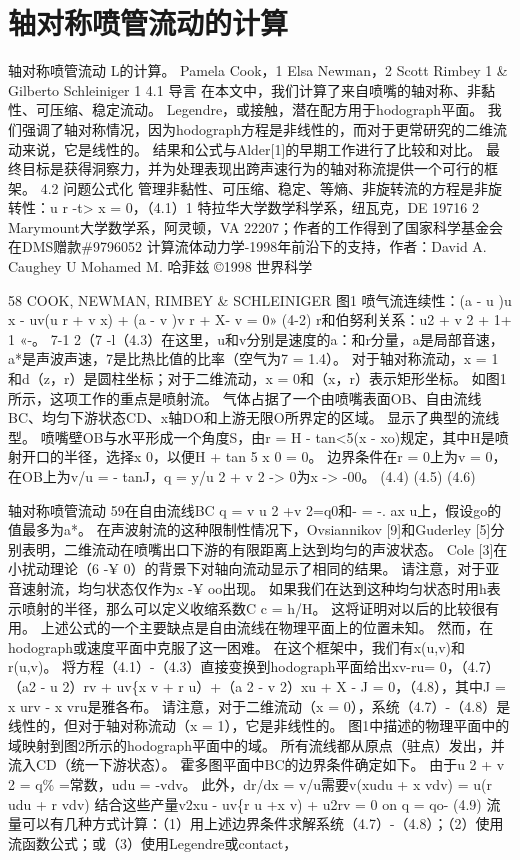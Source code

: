 \documentclass[UTF8,11pt,a4paper,openany,fontset=fandol]{ctexbook}
\begin{document}
\chapter{轴对称喷管流动的计算}
轴对称喷管流动 L的计算。 Pamela Cook，1 Elsa Newman，2 Scott Rimbey 1 \& Gilberto Schleiniger 1 4.1 导言 在本文中，我们计算了来自喷嘴的轴对称、非黏性、可压缩、稳定流动。 Legendre，或接触，潜在配方用于hodograph平面。 我们强调了轴对称情况，因为hodograph方程是非线性的，而对于更常研究的二维流动来说，它是线性的。 结果和公式与Alder[1]的早期工作进行了比较和对比。 最终目标是获得洞察力，并为处理表现出跨声速行为的轴对称流提供一个可行的框架。 4.2 问题公式化 管理非黏性、可压缩、稳定、等熵、非旋转流的方程是非旋转性：u r -t> x = 0，（4.1）1 特拉华大学数学科学系，纽瓦克，DE 19716 2 Marymount大学数学系，阿灵顿，VA 22207；作者的工作得到了国家科学基金会在DMS赠款\#9796052 计算流体动力学-1998年前沿下的支持，作者：David A. Caughey U Mohamed M. 哈菲兹 ©1998 世界科学

58 COOK, NEWMAN, RIMBEY \& SCHLEINIGER 图1 喷气流连续性：(a - u )u x - uv(u r + v x) + (a - v )v r + X- v = 0» (4-2) r和伯努利关系：u2 + v 2 + 1+ 1 «-。 7-1 2（7 -l（4.3）在这里，u和v分别是速度的a：和r分量，a是局部音速，a*是声波声速，7是比热比值的比率（空气为7 = 1.4）。 对于轴对称流动，x = 1和d（z，r）是圆柱坐标；对于二维流动，x = 0和（x，r）表示矩形坐标。 如图1所示，这项工作的重点是喷射流。 气体占据了一个由喷嘴表面OB、自由流线BC、均匀下游状态CD、x轴DO和上游无限O所界定的区域。 显示了典型的流线型。 喷嘴壁OB与水平形成一个角度S，由r = H - tan<5(x - xo)规定，其中H是喷射开口的半径，选择x 0，以便H + tan 5 x 0 = 0。 边界条件在r = 0上为v = 0，在OB上为v/u = - tanJ，q = y/u 2 + v 2 -> 0为x -> -00。 (4.4) (4.5) (4.6)

轴对称喷管流动 59在自由流线BC q = v u 2 +v 2=q0和- = -. ax u上，假设go的值最多为a*。 在声波射流的这种限制性情况下，Ovsiannikov [9]和Guderley [5]分别表明，二维流动在喷嘴出口下游的有限距离上达到均匀的声波状态。 Cole [3]在小扰动理论（6 -¥ 0）的背景下对轴向流动显示了相同的结果。 请注意，对于亚音速射流，均匀状态仅作为x -¥ oo出现。 如果我们在达到这种均匀状态时用h表示喷射的半径，那么可以定义收缩系数C c = h/H。 这将证明对以后的比较很有用。 上述公式的一个主要缺点是自由流线在物理平面上的位置未知。 然而，在hodograph或速度平面中克服了这一困难。 在这个框架中，我们有x(u,v)和r(u,v)。 将方程（4.1）-（4.3）直接变换到hodograph平面给出xv-ru= 0，（4.7）（a2 - u 2）rv + uv\{x v + r u）+（a 2 - v 2）xu + X - J = 0，（4.8），其中J = x urv - x vru是雅各布。 请注意，对于二维流动（x = 0），系统（4.7）-（4.8）是线性的，但对于轴对称流动（x = 1），它是非线性的。 图1中描述的物理平面中的域映射到图2所示的hodograph平面中的域。 所有流线都从原点（驻点）发出，并流入CD（统一下游状态）。 霍多图平面中BC的边界条件确定如下。 由于u 2 + v 2 = q\% =常数，udu = -vdv。 此外，dr/dx = v/u需要v(xudu + x vdv) = u(r udu + r vdv) 结合这些产量v2xu - uv\{r u +x v) + u2rv = 0 on q = qo- (4.9) 流量可以有几种方式计算：（1）用上述边界条件求解系统（4.7）-（4.8）；（2）使用流函数公式；或（3）使用Legendre或contact，
\end{document}
